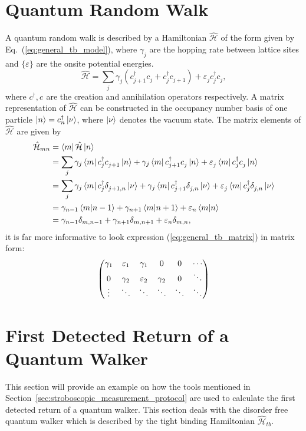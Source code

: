 \documentclass[12pt]{article}
\numberwithin{equation}{section}
\renewcommand{\H}{\mathcal{\hat{H}}}
\newcommand{\1}{\mathbb{1}}
\newcommand{\annihilation}{c^{}}
\newcommand{\creation}{c^{\dagger}}
\begin{document}
\section{Quantum Random Walk}
A quantum random walk is described by a Hamiltonian $\H$ of the form given by Eq.~(\ref{eq:general_tb_model}), where $\gamma_j$ are the hopping rate between lattice sites and $\{\varepsilon\}$ are the onsite potential energies.
\begin{equation}\label{eq:general_tb_model}
    \H=\sum_{j}\gamma^{}_j(\creation_{j+1}\annihilation_j+\creation_{j}\annihilation_{j+1})+\varepsilon^{}_j\creation_j\annihilation_j,
\end{equation}
where $\creation,\annihilation$ are the creation and annihilation operators respectively.
A matrix representation of $\H$ can be constructed in the occupancy number basis of one particle $\ket{n}=\creation_n\ket{\nu}$, where $\ket{\nu}$ denotes the vacuum state. The matrix elements of $\H$ are given by
\begin{align}
    \H_{mn}&=\bra{m}\H\ket{n}   
    \\
    &=\sum_j \gamma_j\bra{m}\creation_{j}\annihilation_{j+1}\ket{n} +\gamma_j\bra{m}\creation_{j+1}\annihilation_{j}\ket{n} + \varepsilon^{}_j\bra{m}\creation_{j}\annihilation_{j}\ket{n} 
    \\
    &= \sum_j \gamma_j\bra{m}\creation_{j}\delta^{}_{j+1,n}\ket{\nu}
    +\gamma_j\bra{m}\creation_{j+1}\delta^{}_{j,n}\ket{\nu} +
    \varepsilon^{}_j\bra{m}\creation_{j}\delta^{}_{j,n}\ket{\nu} 
    \\
    &= \gamma_{n-1}\bra{m}\ket{n-1}+\gamma_{n+1}\bra{m}\ket{n+1}+\varepsilon_n\bra{m}\ket{n}
    \\
    &=\gamma_{n-1}\delta_{m,n-1}+\gamma_{n+1}\delta_{m,n+1}+\varepsilon_n\delta_{m,n}, \label{eq:general_tb_matrix}
\end{align}
it is far more informative to look expression (\ref{eq:general_tb_matrix}) in matrix form:
\begin{equation}
    \mqty(
    \gamma_1 & \varepsilon_1 & \gamma_1 & 0 & 0 &\cdots 
    \\
    0 & \gamma_2 & \varepsilon_2 & \gamma_2 & 0&\ddots
    \\
    \vdots & \ddots & \ddots & \ddots  & \ddots &\ddots
    )
\end{equation}
\newpage






\section{First Detected Return of a Quantum Walker}
This section will provide an example on how the tools mentioned in Section~\ref{sec:stroboscopic_measurement_protocol} are used to calculate the first detected return of a quantum walker. This section deals with the disorder free quantum walker which is described by the tight binding Hamiltonian $\H_{tb}$.
\end{document}
